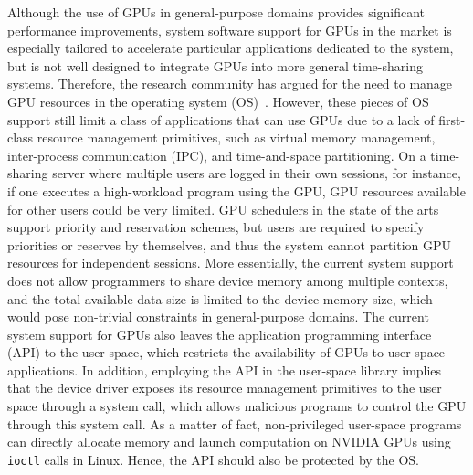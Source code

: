 Although the use of GPUs in general-purpose domains provides significant
performance improvements, system software support for GPUs in the market
is especially  tailored to accelerate particular applications dedicated
to the system, but is not well designed to integrate GPUs into more
general time-sharing systems.
Therefore, the research community has argued for the need to manage GPU
resources in the operating system (OS)~\cite{Bautin_MCNC08, Kato_ATC11,
Rossbach_SOSP11}.
However, these pieces of OS support still limit a class of applications
that can use GPUs due to a lack of first-class resource management
primitives, such as virtual memory management, inter-process
communication (IPC), and time-and-space partitioning.
On a time-sharing server where multiple users are logged in their own
sessions, for instance, if one executes a high-workload program using
the GPU, GPU 
resources available for other users could be very limited.
GPU schedulers in the state of the arts~\cite{Kato_ATC11,
Rossbach_SOSP11} support priority and reservation schemes, but users
are required to specify priorities or reserves by themselves, and thus
the system cannot partition GPU resources for independent sessions.
More essentially, the current system support does not allow
programmers to share device memory among multiple contexts, and the
total available data size is limited to the device memory size, which
would pose non-trivial constraints in general-purpose domains.
The current system support for GPUs also leaves the application
programming interface (API) to the user space, which restricts the
availability of GPUs to user-space applications.
In addition, employing the API in the user-space library implies that
the device driver exposes its resource management primitives to the user
space through a system call, which allows malicious programs to control
the GPU through this system call. 
As a matter of fact, non-privileged user-space programs can directly
allocate memory and launch computation on NVIDIA GPUs using
\texttt{ioctl} calls in Linux.
Hence, the API should also be protected by the OS.

